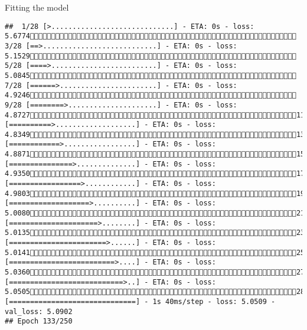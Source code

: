 \documentclass[
  ignorenonframetext,
]{beamer}
\begin{document}
\begin{frame}[fragile]{Fitting the model}
\begin{verbatim}
##  1/28 [>.............................] - ETA: 0s - loss: 5.6774 3/28 [==>...........................] - ETA: 0s - loss: 5.1529 5/28 [====>.........................] - ETA: 0s - loss: 5.0845 7/28 [======>.......................] - ETA: 0s - loss: 4.9246 9/28 [========>.....................] - ETA: 0s - loss: 4.872711/28 [==========>...................] - ETA: 0s - loss: 4.834913/28 [============>.................] - ETA: 0s - loss: 4.887115/28 [===============>..............] - ETA: 0s - loss: 4.935017/28 [=================>............] - ETA: 0s - loss: 4.980319/28 [===================>..........] - ETA: 0s - loss: 5.008021/28 [=====================>........] - ETA: 0s - loss: 5.013523/28 [=======================>......] - ETA: 0s - loss: 5.014125/28 [=========================>....] - ETA: 0s - loss: 5.036027/28 [===========================>..] - ETA: 0s - loss: 5.050528/28 [==============================] - 1s 40ms/step - loss: 5.0509 - val_loss: 5.0902
## Epoch 133/250

\end{verbatim}
\end{frame}
\end{document}
